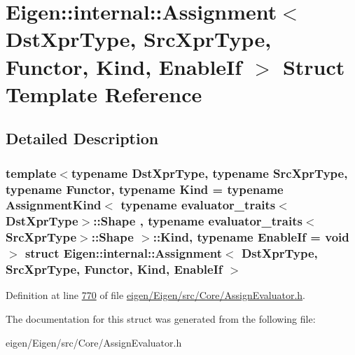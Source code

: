 \hypertarget{struct_eigen_1_1internal_1_1_assignment}{}\section{Eigen\+:\+:internal\+:\+:Assignment$<$ Dst\+Xpr\+Type, Src\+Xpr\+Type, Functor, Kind, Enable\+If $>$ Struct Template Reference}
\label{struct_eigen_1_1internal_1_1_assignment}


\subsection{Detailed Description}
\subsubsection*{template$<$typename Dst\+Xpr\+Type, typename Src\+Xpr\+Type, typename Functor, typename Kind = typename Assignment\+Kind$<$ typename evaluator\+\_\+traits$<$\+Dst\+Xpr\+Type$>$\+::\+Shape , typename evaluator\+\_\+traits$<$\+Src\+Xpr\+Type$>$\+::\+Shape $>$\+::\+Kind, typename Enable\+If = void$>$\newline
struct Eigen\+::internal\+::\+Assignment$<$ Dst\+Xpr\+Type, Src\+Xpr\+Type, Functor, Kind, Enable\+If $>$}



Definition at line \hyperlink{eigen_2_eigen_2src_2_core_2_assign_evaluator_8h_source_l00770}{770} of file \hyperlink{eigen_2_eigen_2src_2_core_2_assign_evaluator_8h_source}{eigen/\+Eigen/src/\+Core/\+Assign\+Evaluator.\+h}.



The documentation for this struct was generated from the following file\+:\begin{DoxyCompactItemize}
\item 
eigen/\+Eigen/src/\+Core/\+Assign\+Evaluator.\+h\end{DoxyCompactItemize}
